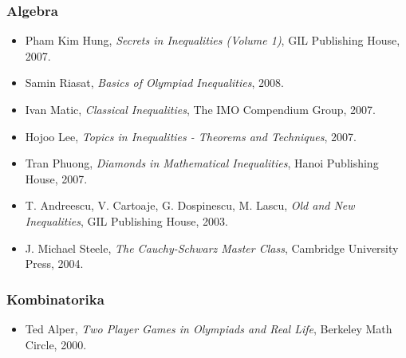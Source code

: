 \subsubsection{Algebra}

\begin{itemize}
  \item Pham Kim Hung, \emph{Secrets in Inequalities (Volume 1)}, GIL
    Publishing House, 2007.
  \item Samin Riasat, \emph{Basics of Olympiad Inequalities}, 2008.
  \item Ivan Matic, \emph{Classical Inequalities}, The IMO Compendium
    Group, 2007.
  \item Hojoo Lee, \emph{Topics in Inequalities - Theorems and
    Techniques}, 2007.
  \item Tran Phuong, \emph{Diamonds in Mathematical Inequalities},
    Hanoi Publishing House, 2007.
  \item T. Andreescu, V. Cartoaje, G. Dospinescu, M. Lascu, \emph{Old
    and New Inequalities}, GIL Publishing House, 2003.
  \item J. Michael Steele, \emph{The Cauchy-Schwarz Master Class},
    Cambridge University Press, 2004.
\end{itemize}

\subsubsection{Kombinatorika}
\begin{itemize}
  \item Ted Alper, \emph{Two Player Games in Olympiads and Real Life},
    Berkeley Math Circle, 2000.
\end{itemize}
